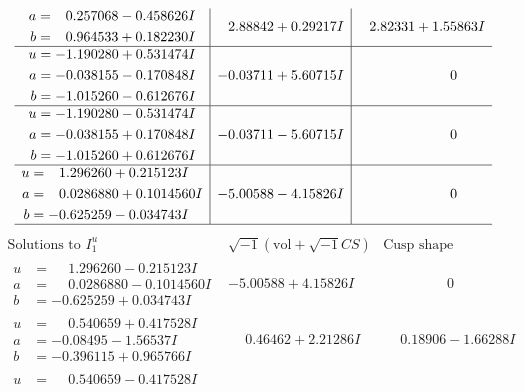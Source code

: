 \documentclass[1p]{elsarticle_modified}
\theoremstyle{definition}
\newcommand{\I}{\sqrt{-1}}
\begin{document}
$$\begin{array}{c|c|c}
\begin{aligned}
a &= \phantom{-}0.257068 - 0.458626 I \\
b &= \phantom{-}0.964533 + 0.182230 I\end{aligned}
 & \phantom{-}2.88842 + 0.29217 I & \phantom{-}2.82331 + 1.55863 I \\ \hline\begin{aligned}
u &= -1.190280 + 0.531474 I \\
a &= -0.038155 - 0.170848 I \\
b &= -1.015260 - 0.612676 I\end{aligned}
 & -0.03711 + 5.60715 I & \phantom{-0.000000 } 0 \\ \hline\begin{aligned}
u &= -1.190280 - 0.531474 I \\
a &= -0.038155 + 0.170848 I \\
b &= -1.015260 + 0.612676 I\end{aligned}
 & -0.03711 - 5.60715 I & \phantom{-0.000000 } 0 \\ \hline\begin{aligned}
u &= \phantom{-}1.296260 + 0.215123 I \\
a &= \phantom{-}0.0286880 + 0.1014560 I \\
b &= -0.625259 - 0.034743 I\end{aligned}
 & -5.00588 - 4.15826 I & \phantom{-0.000000 } 0\\
 \hline 
 \end{array}$$\newpage$$\begin{array}{c|c|c}  
\text{Solutions to }I^u_{1}& \I (\text{vol} + \sqrt{-1}CS) & \text{Cusp shape}\\
 \hline 
\begin{aligned}
u &= \phantom{-}1.296260 - 0.215123 I \\
a &= \phantom{-}0.0286880 - 0.1014560 I \\
b &= -0.625259 + 0.034743 I\end{aligned}
 & -5.00588 + 4.15826 I & \phantom{-0.000000 } 0 \\ \hline\begin{aligned}
u &= \phantom{-}0.540659 + 0.417528 I \\
a &= -0.08495 - 1.56537 I \\
b &= -0.396115 + 0.965766 I\end{aligned}
 & \phantom{-}0.46462 + 2.21286 I & \phantom{-}0.18906 - 1.66288 I \\ \hline\begin{aligned}
u &= \phantom{-}0.540659 - 0.417528 I \\

\end{aligned}
\end{array}$$
\end{document}
